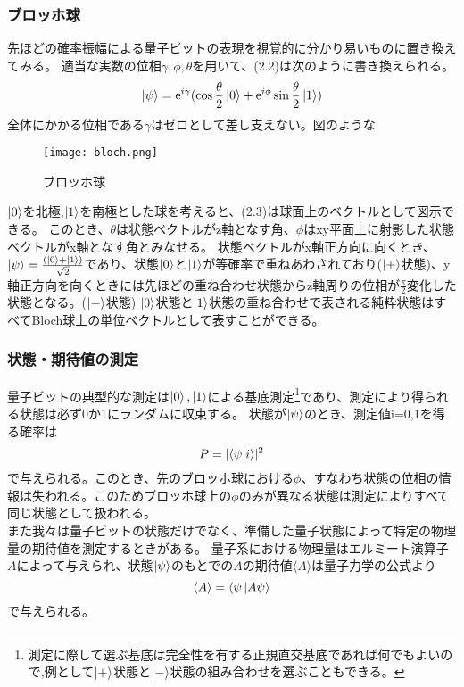         \subsubsection{ブロッホ球}
        先ほどの確率振幅による量子ビットの表現を視覚的に分かり易いものに置き換えてみる。
        適当な実数の位相$\gamma,\phi,\theta$を用いて、(2.2)は次のように書き換えられる。
        \begin{equation}
            \ket{\psi} =\mathrm{e}^{i\gamma}(\cos \frac{\theta}{2} \ket{0} +\mathrm{e}^{i\phi} \sin \frac{\theta}{2} \ket{1})
        \end{equation}
        全体にかかる位相である$\gamma$はゼロとして差し支えない。図のような
        \begin{figure}
            \begin{center}
                \texttt{[image: bloch.png]}
                \caption{ブロッホ球}
            \end{center}
        \end{figure}
        $\ket{0}$を北極,$\ket{1}$を南極とした球を考えると、(2.3)は球面上のベクトルとして図示できる。
        このとき、$\theta$は状態ベクトルがz軸となす角、$\phi$はxy平面上に射影した状態ベクトルがx軸となす角とみなせる。
        状態ベクトルがx軸正方向に向くとき、$\ket{\psi} = \frac{(\ket{0}+\ket{1})}{\sqrt2}$であり、状態$\ket{0}$と$\ket{1}$が等確率で重ねあわされており($\ket{+}$状態)、y軸正方向を向くときには先ほどの重ね合わせ状態からz軸周りの位相が$\frac{\pi}{2}$変化した状態となる。($\ket{-}$状態)
        $\ket{0}$状態と$\ket{1}$状態の重ね合わせで表される純粋状態はすべてBloch球上の単位ベクトルとして表すことができる。

        \subsubsection{状態・期待値の測定}
        量子ビットの典型的な測定は{$\ket{0},\ket{1}$}による基底測定\footnote{測定に際して選ぶ基底は完全性を有する正規直交基底であれば何でもよいので,例として$\ket{+}$状態と$\ket{-}$状態の組み合わせを選ぶこともできる。}であり、測定により得られる状態は必ず0か1にランダムに収束する。
        状態が$\ket{\psi}$のとき、測定値i=0,1を得る確率は
        \begin{equation}
            P=|\inner<\psi,i>|^2
        \end{equation}
        で与えられる。このとき、先のブロッホ球における$\phi$、すなわち状態の位相の情報は失われる。このためブロッホ球上の$\phi$のみが異なる状態は測定によりすべて同じ状態として扱われる。\\
        また我々は量子ビットの状態だけでなく、準備した量子状態によって特定の物理量の期待値を測定するときがある。
        量子系における物理量はエルミート演算子$A$によって与えられ、状態$\ket{\psi}$のもとでの$A$の期待値$\langle A \rangle$は量子力学の公式より
        \begin{equation}
            \langle A \rangle =\langle \psi\ket{A\psi}
        \end{equation}
        で与えられる。


